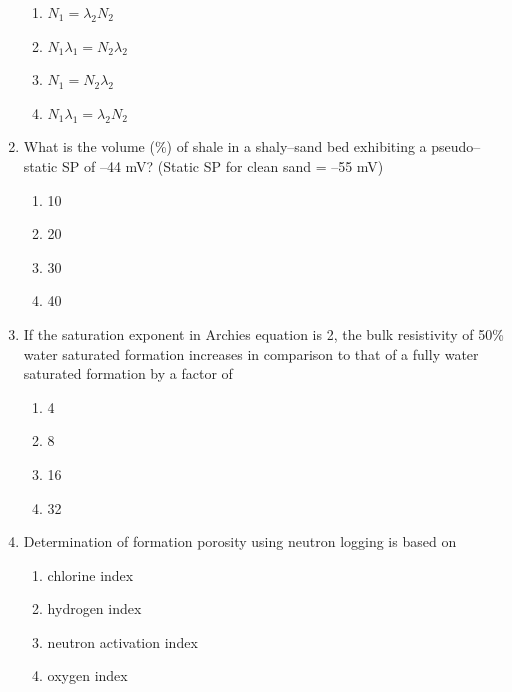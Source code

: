 \documentclass[journal,12pt,onecolumn]{IEEEtran}
\theoremstyle{remark}
\begin{document}
\begin{enumerate}[resume]
\begin{multicols}{2}
\begin{enumerate}
\item $N_1 = \lambda_2 N_2$  
\item $N_1 \lambda_1 = N_2 \lambda_2$  
\item $N_1 = N_2 \lambda_2$  
\item $N_1 \lambda_1 = \lambda_2 N_2$  
\end{enumerate}
\end{multicols}
\vspace{0.5cm}

\item What is the volume (\%) of shale in a shaly--sand bed exhibiting a pseudo--static SP of --44 mV? (Static SP for clean sand = --55 mV)

\begin{multicols}{4}
\begin{enumerate}
\item 10  
\item 20  
\item 30  
\item 40  
\end{enumerate}
\end{multicols}
\vspace{0.5cm}

\item If the saturation exponent in Archies equation is 2, the bulk resistivity of 50\% water saturated formation increases in comparison to that of a fully water saturated formation by a factor of

\begin{multicols}{4}
\begin{enumerate}
\item 4  
\item 8  
\item 16  
\item 32  
\end{enumerate}
\end{multicols}
\vspace{0.5cm}

\item Determination of formation porosity using neutron logging is based on

\begin{multicols}{2}
\begin{enumerate}
\item chlorine index  
\item hydrogen index  
\item neutron activation index  
\item oxygen index  
\end{enumerate}
\end{multicols}
\vspace{0.5cm}


\end{enumerate}
\end{document}
